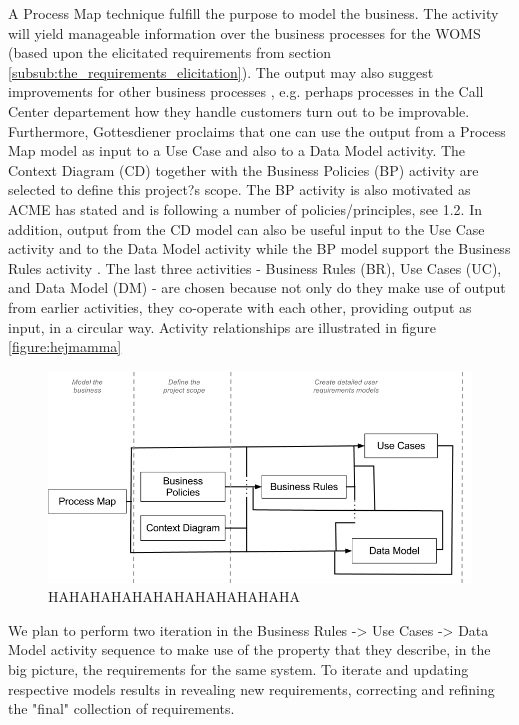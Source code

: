 \documentclass[a4paper]{article}
\begin{document}
A Process Map technique fulfill the purpose to model the business. The activity will yield manageable information over the business processes for the WOMS (based upon the elicitated requirements from section \ref{subsub:the_requirements_elicitation}). The output may also suggest improvements for other business processes \cite{gottes s. 122}, e.g. perhaps processes in the Call Center departement how they handle customers turn out to be improvable. Furthermore, Gottesdiener proclaims that one can use the output from a Process Map model as input to a Use Case and also to a Data Model activity\cite{gottes s. 126}.
      The Context Diagram (CD) together with the Business Policies (BP) activity are selected to define this project?s scope. The BP activity is also motivated as ACME has stated and is following a number of policies/principles, see 1.2. In addition, output from the CD model can also be useful input to the Use Case activity and to the Data Model activity\cite{gottes s. 131} while the BP model support the Business Rules activity \cite{got. p. 143}.
     The last three activities - Business Rules (BR), Use Cases (UC), and Data Model (DM) - are chosen because not only do they make use of output from earlier activities, they co-operate with each other, providing output as input, in a circular way. Activity relationships are illustrated in figure \ref{figure:hejmamma}
     
\begin{figure}[h!]
	\centering
		\includegraphics[width=1\textwidth]{images/model_the_business.png}
	\caption{HAHAHAHAHAHAHAHAHAHAHAHA}
	\label{figure:business}
\end{figure}
     
We plan to perform two iteration in the Business Rules -> Use Cases -> Data Model activity sequence to make use of the property that they describe, in the big picture, the requirements for the same system. To iterate and updating respective models results in revealing new requirements, correcting and refining the "final" collection of requirements.
\end{document}
